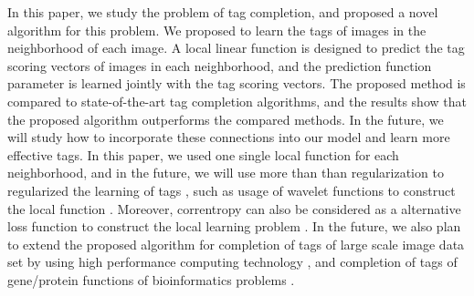 \documentclass[runningheads,a4paper]{llncs}
\begin{document}
In this paper, we study the problem of tag completion, and proposed a novel algorithm for this problem. We proposed to learn the tags of images in the neighborhood of each image. A local linear function is designed to predict the tag scoring vectors of images in each neighborhood, and the prediction function parameter is learned jointly with the tag scoring vectors. The proposed method is compared to state-of-the-art tag completion algorithms, and the results show that the proposed algorithm outperforms the compared methods. In the future, we will study how to incorporate these connections into our model and learn more effective tags. In this paper, we used one single local function for each neighborhood, and in the future, we will use more than than regularization to regularized the learning of tags \cite{wang2012multiplegraph,wang2013multiple}, such as usage of wavelet functions to construct the local function \cite{liu2012wavpeak}. Moreover, correntropy can also be considered as a alternative loss function to construct the local learning problem \cite{wang2013non,Xing2014483,Li2015850,Zhang2015120,wang2014effective}. In the future, we also plan to extend the proposed algorithm for completion of tags of large scale image data set by using high performance computing technology \cite{zhou2013exploring,wang2015towards,zhang2011gpapriori,zhang2013accelerating,zhang2011frequent,zhang2013fpga,gao2014sparse,zhang2014lucas,li2013zht,zhao2014fusionfs,li2013distributed,wang2013using,wang2014optimizing,wang2014next}, and completion of tags of gene/protein functions of bioinformatics problems \cite{hu2009improving,zhang2009bayesian,zhang2010bioinformatics,hu2009improving,wang2015multiple,wang2015supervised}.
\end{document}

